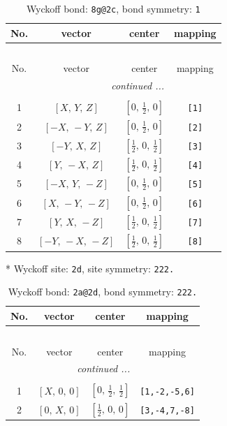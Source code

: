 \documentclass[fleqn,8pt]{jsarticle}
\begin{document}
\renewcommand{\arraystretch}{1.2}
\begin{longtable}{cccc}
\caption{Wyckoff bond: {\tt 8g@2c}, bond symmetry: {\tt 1}}
 \\
 \hline \hline
No. & vector & center & mapping \\ \hline \endfirsthead

\multicolumn{3}{l}{\tablename\ \thetable{}} \\
 \hline \hline
No. & vector & center & mapping \\ \hline \endhead

 \hline \hline
\multicolumn{3}{r}{\footnotesize\it continued ...} \\ \endfoot

 \hline \hline
\multicolumn{3}{r}{} \\ \endlastfoot

1 & $\left[ X,\, Y,\, Z \right]$ & $\left[ 0,\, \frac{1}{2},\, 0 \right]$ & {\tt [1]} \\ \hline
2 & $\left[ - X,\, - Y,\, Z \right]$ & $\left[ 0,\, \frac{1}{2},\, 0 \right]$ & {\tt [2]} \\ \hline
3 & $\left[ - Y,\, X,\, Z \right]$ & $\left[ \frac{1}{2},\, 0,\, \frac{1}{2} \right]$ & {\tt [3]} \\ \hline
4 & $\left[ Y,\, - X,\, Z \right]$ & $\left[ \frac{1}{2},\, 0,\, \frac{1}{2} \right]$ & {\tt [4]} \\ \hline
5 & $\left[ - X,\, Y,\, - Z \right]$ & $\left[ 0,\, \frac{1}{2},\, 0 \right]$ & {\tt [5]} \\ \hline
6 & $\left[ X,\, - Y,\, - Z \right]$ & $\left[ 0,\, \frac{1}{2},\, 0 \right]$ & {\tt [6]} \\ \hline
7 & $\left[ Y,\, X,\, - Z \right]$ & $\left[ \frac{1}{2},\, 0,\, \frac{1}{2} \right]$ & {\tt [7]} \\ \hline
8 & $\left[ - Y,\, - X,\, - Z \right]$ & $\left[ \frac{1}{2},\, 0,\, \frac{1}{2} \right]$ & {\tt [8]} \\
\end{longtable}
* Wyckoff site: {\tt 2d}, site symmetry: {\tt 222.}
\renewcommand{\arraystretch}{1.2}
\begin{longtable}{cccc}
\caption{Wyckoff bond: {\tt 2a@2d}, bond symmetry: {\tt 222.}}
 \\
 \hline \hline
No. & vector & center & mapping \\ \hline \endfirsthead

\multicolumn{3}{l}{\tablename\ \thetable{}} \\
 \hline \hline
No. & vector & center & mapping \\ \hline \endhead

 \hline \hline
\multicolumn{3}{r}{\footnotesize\it continued ...} \\ \endfoot

 \hline \hline
\multicolumn{3}{r}{} \\ \endlastfoot

1 & $\left[ X,\, 0,\, 0 \right]$ & $\left[ 0,\, \frac{1}{2},\, \frac{1}{2} \right]$ & {\tt [1,-2,-5,6]} \\ \hline
2 & $\left[ 0,\, X,\, 0 \right]$ & $\left[ \frac{1}{2},\, 0,\, 0 \right]$ & {\tt [3,-4,7,-8]} \\
\end{longtable}
\end{document}
